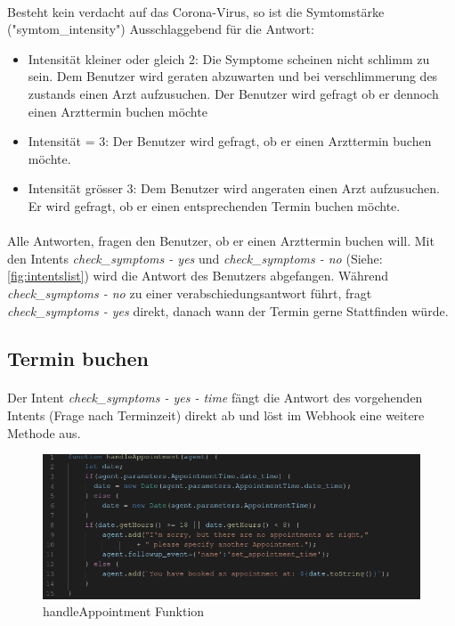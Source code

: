 \documentclass[11pt, letterpaper]{article}
\begin{document}
        \paragraph{}
            Besteht kein verdacht auf das Corona-Virus, so ist die Symtomstärke ("symtom\_intensity") Ausschlaggebend für die Antwort:
            \begin{itemize}
                \item Intensität kleiner oder gleich 2: Die Symptome scheinen nicht schlimm zu sein. Dem Benutzer wird geraten abzuwarten und bei
                    verschlimmerung des zustands einen Arzt aufzusuchen. Der Benutzer wird gefragt ob er dennoch einen Arzttermin buchen
                    möchte
                \item Intensität = 3: Der Benutzer wird gefragt, ob er einen Arzttermin buchen möchte.
                \item Intensität grösser 3: Dem Benutzer wird angeraten einen Arzt aufzusuchen. Er wird gefragt, ob er einen entsprechenden Termin
                    buchen möchte.
            \end{itemize}

        \paragraph{}
            Alle Antworten, fragen den Benutzer, ob er einen Arzttermin buchen will. Mit den Intents \emph{check\_symptoms - yes} und \emph{check\_symptoms - no}
            (Siehe: \ref{fig:intentslist}) wird die Antwort des Benutzers abgefangen. Während \emph{check\_symptoms - no} zu einer verabschiedungsantwort führt,
            fragt \emph{check\_symptoms - yes} direkt, danach wann der Termin gerne Stattfinden würde.

    \subsection{Termin buchen}
        \paragraph{}
            Der Intent \emph{check\_symptoms - yes - time} fängt die Antwort des vorgehenden Intents (Frage nach Terminzeit) direkt ab und löst im Webhook
            eine weitere Methode aus.
        \begin{figure}[h!]
            \begin{center}
                \includegraphics[width=0.7\linewidth]{ressources/handleAppointmentFunction.png}
            \end{center}
            \caption{handleAppointment Funktion}
            \label{fig:handleappointmentfunction}
        \end{figure}
\end{document}
